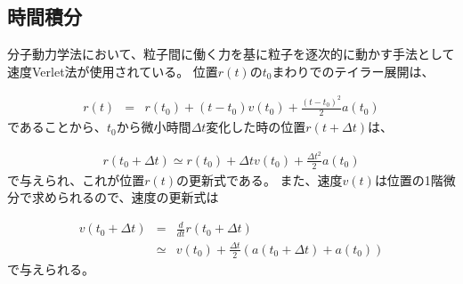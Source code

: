 \documentclass[titlepage]{jsreport}
\begin{document}



\subsection{時間積分}\label{principle-subsec:time-integral}
分子動力学法において、粒子間に働く力を基に粒子を逐次的に動かす手法として速度Verlet法が使用されている。
位置$r(t)$の$t_0$まわりでのテイラー展開は、

\large
\begin{eqnarray}
r(t) &=& r(t_0)+(t-t_0)v(t_0)+\frac{(t-t_0)^2}{2}a(t_0) \label{eq:taylor}
\end{eqnarray}
\normalsize
であることから、$t_0$から微小時間$\Delta{t}$変化した時の位置$r(t+\Delta{t})$は、

\large
\begin{eqnarray}
r(t_0+\Delta{t}) \simeq r(t_0)+\Delta{t}v(t_0)+\frac{\Delta{t}^2}{2}a(t_0) \label{eq:r-renewal-formula}
\end{eqnarray}
\normalsize
で与えられ、これが位置$r(t)$の更新式である\cite{velocity-verlet}。
また、速度$v(t)$は位置の1階微分で求められるので、速度の更新式は

\large
\begin{eqnarray}
v(t_0+\Delta{t}) &=& \frac{d}{dt}r(t_0+\Delta{t}) \nonumber \\
&\simeq& v(t_0)+\frac{\Delta{t}}{2}(a(t_0+\Delta{t})+a(t_0)) \label{eq:v-renewal-formula}
\end{eqnarray}
\normalsize
で与えられる。
\end{document}
